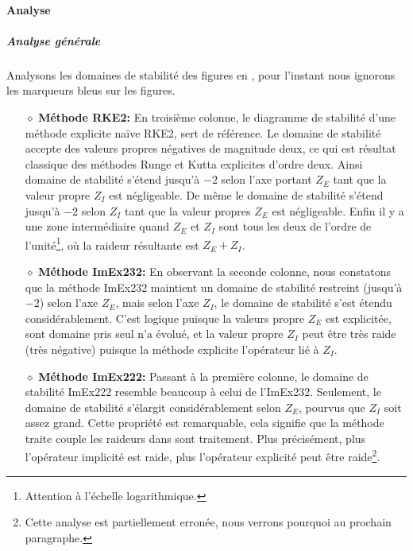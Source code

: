         \paragraph{Analyse}
            \subparagraph{Analyse générale}\label{par:analyse_generale_stab_nagumo}
            Analysons les domaines de stabilité des figures en , pour l'instant nous ignorons les marqueurs bleus sur les figures.
            \begin{itemize}
                \item[$\diamond$]\textbf{Méthode RKE2:} En troisième colonne, le diagramme de stabilité d'une méthode explicite naïve RKE2, sert de référence. 
                    Le domaine de stabilité accepte des valeurs propres négatives de magnitude deux, ce qui est résultat classique des méthodes Runge et Kutta explicites d'ordre deux.
                    Ainsi domaine de stabilité s'étend jusqu'à $-2$ selon l'axe portant $Z_E$ tant que la valeur propre $Z_I$ est négligeable.
                    De même le domaine de stabilité s'étend jusqu'à $-2$ selon $Z_I$ tant que la valeur propres $Z_E$ est négligeable. 
                    Enfin il y a une zone intermédiaire quand $Z_E$ et $Z_I$ sont tous les deux de l'ordre de l'unité\footnote{Attention à l'échelle logarithmique.},
                    où la raideur résultante est $Z_E+Z_I$.

                \item[$\diamond$]\textbf{Méthode ImEx232:} En observant la seconde colonne, nous constatons que la méthode ImEx232 maintient un domaine de stabilité restreint (jusqu'à $-2$) selon l'axe $Z_E$,
                    mais selon l'axe $Z_I$, le domaine de stabilité s'est étendu considérablement. C'est logique puisque la valeurs propre $Z_E$ est explicitée,
                    sont domaine pris seul n'a évolué, et la valeur propre $Z_I$ peut être très raide (très négative) puisque la méthode explicite l'opérateur lié à $Z_I$.

                \item[$\diamond$]\textbf{Méthode ImEx222:} Passant à la première colonne, le domaine de stabilité ImEx222 resemble beaucoup à celui de l'ImEx232. Seulement, le domaine de stabilité s'élargit considérablement
                    selon $Z_E$, pourvus que $Z_I$ soit assez grand. Cette propriété est remarquable, cela signifie que la méthode traite couple les raideurs dans sont traitement. 
                    Plus précisément, plus l'opérateur implicité est raide, plus l'opérateur explicité peut être raide\footnote{Cette analyse est partiellement erronée, nous verrons 
                    pourquoi au prochain paragraphe.}.
            \end{itemize}

